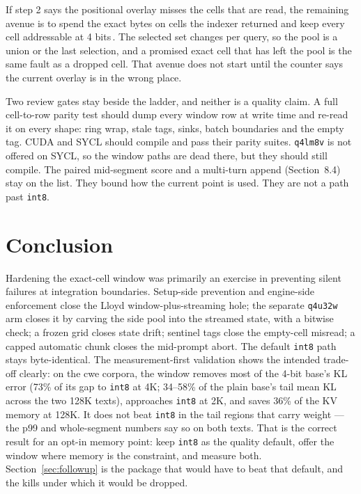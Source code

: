 \documentclass[10pt,twocolumn]{article}
\begin{document}
If step 2 says the positional overlay misses the cells that are read, the remaining avenue is to spend the exact bytes on cells the indexer returned and keep every cell addressable at 4 bits\,\cite{top-k}. The selected set changes per query, so the pool is a union or the last selection, and a promised exact cell that has left the pool is the same fault as a dropped cell. That avenue does not start until the counter says the current overlay is in the wrong place.

Two review gates stay beside the ladder, and neither is a quality claim. A full cell-to-row parity test should dump every window row at write time and re-read it on every shape: ring wrap, stale tags, sinks, batch boundaries and the empty tag. CUDA and SYCL should compile and pass their parity suites. \texttt{q4lm8v} is not offered on SYCL, so the window paths are dead there, but they should still compile. The paired mid-segment score and a multi-turn append (Section~8.4) stay on the list. They bound how the current point is used. They are not a path past \texttt{int8}.

\section{Conclusion}

Hardening the exact-cell window was primarily an exercise in preventing silent failures at integration boundaries. Setup-side prevention and engine-side enforcement close the Lloyd window-plus-streaming hole; the separate \texttt{q4u32w} arm closes it by carving the side pool into the streamed state, with a bitwise check; a frozen grid closes state drift; sentinel tags close the empty-cell misread; a capped automatic chunk closes the mid-prompt abort. The default \texttt{int8} path stays byte-identical. The measurement-first validation shows the intended trade-off clearly: on the cwe corpora, the window removes most of the 4-bit base's KL error (73\% of its gap to \texttt{int8} at 4K; 34--58\% of the plain base's tail mean KL across the two 128K texts), approaches \texttt{int8} at 2K, and saves 36\% of the KV memory at 128K. It does not beat \texttt{int8} in the tail regions that carry weight --- the p99 and whole-segment numbers say so on both texts. That is the correct result for an opt-in memory point: keep \texttt{int8} as the quality default, offer the window where memory is the constraint, and measure both. Section~\ref{sec:followup} is the package that would have to beat that default, and the kills under which it would be dropped.
\end{document}
